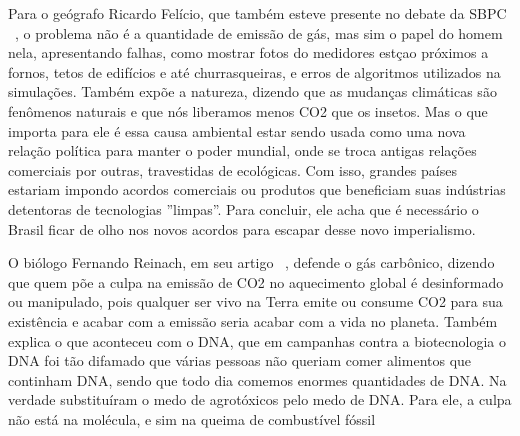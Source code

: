 Para o geógrafo Ricardo Felício, que também esteve presente no debate da
SBPC ~\cite{Medeiros}, o problema não é a quantidade de emissão de gás, mas
sim o papel do homem nela, apresentando falhas, como mostrar fotos do
medidores estçao próximos a fornos, tetos de edifícios e até churrasqueiras,
e erros de algoritmos utilizados na simulações. Também expõe a natureza,
dizendo que as mudanças climáticas são fenômenos naturais e que nós
liberamos menos CO2 que os insetos. Mas o que importa para ele é essa causa
ambiental estar sendo usada como uma nova relação política para manter o
poder mundial, onde se troca antigas relações comerciais por outras,
travestidas de ecológicas. Com isso, grandes países estariam impondo acordos
comerciais ou produtos que beneficiam suas indústrias detentoras de
tecnologias ''limpas''. Para concluir, ele acha que é necessário o Brasil
ficar de olho nos novos acordos para escapar desse novo imperialismo.

O biólogo Fernando Reinach, em seu artigo ~\cite{Fernando}, defende o gás
carbônico, dizendo que quem põe a culpa na emissão de CO2 no aquecimento
global é desinformado ou manipulado, pois qualquer ser vivo na Terra emite
ou consume CO2 para sua existência e acabar com a emissão seria acabar com a
vida no planeta. Também explica o que aconteceu com o DNA, que em
campanhas contra a biotecnologia o DNA foi tão difamado que várias pessoas
não queriam comer alimentos que continham DNA, sendo que todo dia comemos
enormes quantidades de DNA. Na verdade substituíram o medo de agrotóxicos
pelo medo de DNA. Para ele, a culpa não está na molécula, e sim na queima de
combustível fóssil 
